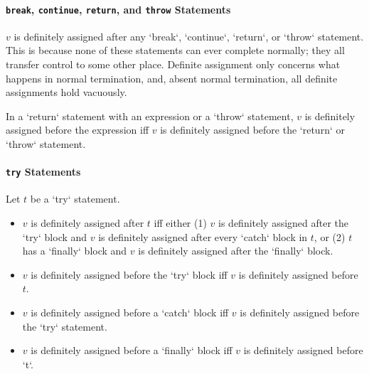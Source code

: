 
\paragraph{{\tt break}, {\tt continue}, {\tt return}, and {\tt throw} Statements}

$v$ is definitely assigned after any \xcd`break`, \xcd`continue`,
\xcd`return`, or \xcd`throw` statement.  This is because none of these
statements can ever complete normally; they all transfer control to some other
place.  Definite assignment only concerns what happens in normal termination,
and, absent normal termination, all definite assignments hold vacuously.

In a \xcd`return` statement with an expression or a \xcd`throw` statement, $v$
is definitely assigned before the expression iff $v$ is definitely assigned
before the \xcd`return` or \xcd`throw` statement. 

\paragraph{ {\tt try} Statements}

Let $t$ be a \xcd`try` statement.  

\begin{itemize}
    \item $v$ is definitely assigned after $t$ iff either 
          (1) $v$ is definitely assigned after the \xcd`try` block and $v$ is
              definitely assigned after every \xcd`catch` block in $t$, or 
          (2) $t$ has a \xcd`finally` block and $v$ is definitely assigned after the \xcd`finally` block. 
    \item $v$ is definitely assigned before the \xcd`try` block iff $v$ is
          definitely assigned before $t$. 
    \item $v$ is definitely assigned before a \xcd`catch` block iff $v$ is
          definitely assigned before the \xcd`try` statement. 

\item $v$ is definitely assigned before a \xcd`finally` block iff $v$ is
      definitely assigned before \xcd`t`.
\end{itemize}
 
